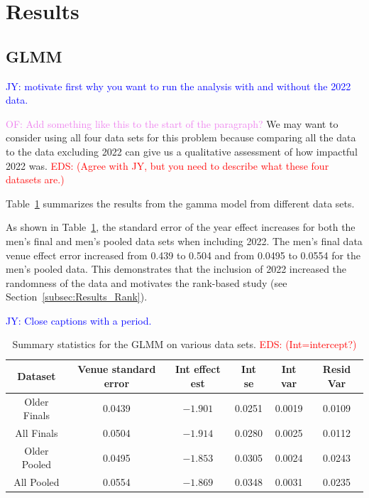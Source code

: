 \documentclass[12pt, letterpaper, titlepage]{article}
\newcommand{\jy}[1]{\textcolor{blue}{JY: #1}}
\newcommand{\eds}[1]{\textcolor{red}{EDS: (#1)}}
\newcommand{\of}[1]{\textcolor{violet}{OF: #1}}
\begin{document}
\section{Results} \label{sec:Results}

\subsection{GLMM} \label{subsec:Results_GLMM}

\jy{motivate first why you want to run the analysis with and without the 2022 data.}

\of{Add something like this to the start of the paragraph?}
We may want to consider using all four data sets for this problem because
comparing all the data to the data excluding 2022 can give us a qualitative
assessment of how impactful 2022 was.
\eds{Agree with JY, but you need to describe what these four datasets are.}

Table~\ref{tab:Gamma_parameters} summarizes the results from the gamma model 
from different data sets.


As shown in Table~\ref{tab:Gamma_parameters}, the standard error of the year
effect increases for both the men's final and men's pooled data sets when
including 2022.  The men's final data venue effect error increased from 0.439
to 0.504 and from 0.0495 to 0.0554 for the men's pooled data.  This demonstrates
that the inclusion of 2022 increased the randomness of the data and motivates
the rank-based study (see Section~\ref{subsec:Results_Rank}).

\jy{Close captions with a period.}
\begin{table}
  \centering
  \caption{Summary statistics for the GLMM on various data sets. 
	\eds{Int=intercept?}}
  \begin{tabular}{c c c c c c}
      \toprule
      Dataset & Venue standard error & Int effect est & Int se & Int var & Resid Var \\
      \midrule
      Older Finals & 0.0439 & $-1.901$ & 0.0251 & 0.0019 & 0.0109 \\
      All Finals & 0.0504 & $-1.914$ & 0.0280 & 0.0025 & 0.0112 \\
      Older Pooled & 0.0495 & $-1.853$ & 0.0305 & 0.0024 & 0.0243 \\
      All Pooled & 0.0554 & $-1.869$ & 0.0348 & 0.0031 & 0.0235 \\
      \bottomrule
  \end{tabular}
  \label{tab:Gamma_parameters}
\end{table}
\end{document}

